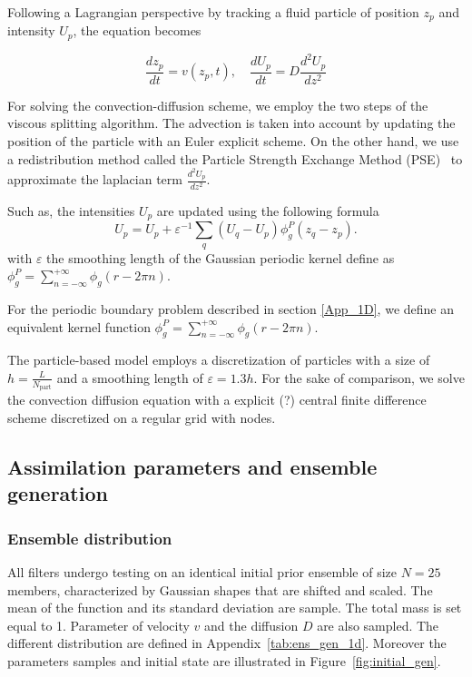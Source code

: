 Following a Lagrangian perspective by tracking a fluid particle of position $z_p$ and intensity $U_p$, the equation becomes

\begin{equation*}
	\frac{dz_p}{dt} = v(z_p, t), \quad \frac{dU_p}{dt} = D \frac{d^2 U_p}{dz^2}
\end{equation*}

For solving the convection-diffusion scheme, we employ the two steps of the viscous splitting algorithm. The advection is taken into account by updating the position of the particle with an Euler explicit scheme.
On the other hand, we use a redistribution method called the Particle Strength Exchange Method (PSE)~\cite{degond_1989,cottet_1990} to approximate the laplacian term $\frac{d^2 U_p}{dz^2}$.

Such as, the intensities $U_p$ are updated using the following formula
\begin{equation*}
	U_p = U_p + \varepsilon^{-1} \sum_{q} (U_q - U_p) \phi_g^P(z_q - z_p).
\end{equation*}with $\varepsilon$ the smoothing length of the Gaussian periodic kernel define as $ \phi^P_g = \sum_{n=-\infty}^{+\infty} \phi_g(r - 2 \pi n)$.

For the periodic boundary problem described in section \ref{App_1D}, we define an equivalent kernel function $\phi^P_g = \sum_{n=-\infty}^{+\infty} \phi_g(r - 2 \pi  n )$.

The particle-based model employs a discretization of \npart{} particles with a size of $h = \frac{L}{N_{\text{part}}}$ and a smoothing length of $\varepsilon = 1.3 h$.
For the sake of comparison, we solve the convection diffusion equation with a explicit (?) central finite difference scheme discretized on a regular grid with \ngrid{} nodes.

\subsection{Assimilation parameters and ensemble generation}

\subsubsection{Ensemble distribution}
All filters undergo testing on an identical initial prior ensemble of size $N = 25$ members, characterized by Gaussian shapes that are shifted and scaled. The mean of the function and its standard deviation are sample. The total mass is set equal to 1. Parameter of velocity $v$ and the diffusion $D$ are also sampled. The different distribution are defined in Appendix~\ref{tab:ens_gen_1d}. Moreover the parameters samples and initial state are illustrated in Figure~\ref{fig:initial_gen}.

